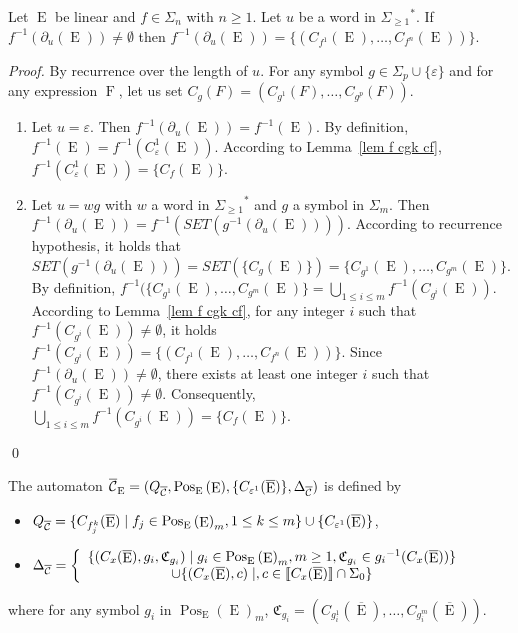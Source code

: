 \documentclass{llncs}
\def\Po#1#2{\Pos_{#1}{(#2)}}
\DeclareMathOperator{\E}{E}
\DeclareMathOperator{\f}{F}
\DeclareMathOperator{\Pos}{Pos}
\def\b#1{\overline{#1}}
\begin{document}
\begin{proposition}\label{prop f deriv u cf}
Let $\E$ be linear and $f\in \Sigma_n$ with $n\geq 1$. Let $u$ be a word in ${\Sigma_{\geq 1}}^*$. If $f^{-1}(\partial_u(\E))\neq \emptyset$ then  $f^{-1}(\partial_u(\E))=\{(C_{f^1}(\E),\ldots,C_{f^n}(\E))\}$.
\end{proposition}
\begin{proof}
 By recurrence over the length of $u$.  For any symbol $g\in\Sigma_p\cup\{\varepsilon\}$ and for any expression $\f$, let us set $C_g(F)=(C_{g^1}(F),\dots,C_{g^p}(F))$.
 \begin{enumerate}
   \item Let $u=\varepsilon$. Then $f^{-1}(\partial_u(\E))=f^{-1}(\E)$. By definition, $f^{-1}(\E)=f^{-1}(C_\varepsilon^1(\E))$. According to Lemma~\ref{lem f cgk cf}, $f^{-1}(C_\varepsilon^1(\E))=\{C_{f}(\E)\}$.
   \item Let $u=wg$ with $w$ a word in ${\Sigma_{\geq 1}}^*$ and $g$ a symbol in $\Sigma_m$. Then $f^{-1}(\partial_u(\E))=f^{-1}(SET(g^{-1}(\partial_u(\E))))$. According to recurrence hypothesis, it holds that $SET(g^{-1}(\partial_u(\E)))=SET(\{C_{g}(\E)\})=\{C_{g^1}(\E),\ldots,C_{g^m}(\E)\}$. By definition, $f^{-1}(\{C_{g^1}(\E),\ldots,C_{g^m}(\E)\}=\bigcup_{1\leq i\leq m} f^{-1}(C_{g^i}(\E))$. According to Lem\-ma~\ref{lem f cgk cf}, for any integer $i$ such that $f^{-1}(C_{g^i}(\E))\neq\emptyset$, it holds  $f^{-1}(C_{g^i}(\E))=\{(C_{f^1}(\E),\ldots,C_{f^n}(\E))\}$. Since $f^{-1}(\partial_u(\E))\neq \emptyset$, there exists at least one integer $i$ such that $f^{-1}(C_{g^i}(\E))\neq\emptyset$. Consequently, $\bigcup_{1\leq i\leq m} f^{-1}(C_{g^i}(\E))=\{C_{f}(\E)\}$.
 \end{enumerate}
 \qed
\end{proof}

\begin{definition}\label{def aut c cont lin}
The automaton ${\cal \b C_{\E}}=(Q_{\b{\cal C}},\Po{\E}{\E},\{C_{{\varepsilon}^1}(\b\E)\},\Delta_{\b{\cal C}})$ is defined by  
 \begin{itemize}
 \item $Q_{\b{\cal C}}=\{C_{f^k_j}(\b\E)\mid f_j\in \Po{\E}{\E}_m,1\leq k\leq m\}\cup\{C_{{\varepsilon}^1}(\b\E)\}$,
\item $\Delta_{\b{\cal C}}=
  \left\{\begin{array}{c}
      \{(C_{x}(\b\E),g_i,\mathfrak{C}_{g_i})\mid  g_i\in\Po{\E}{\E}_m,m\geq 1, \mathfrak{C}_{g_i}\in {g_i}^{-1}(C_{x}(\b\E))\}\\
      \cup\{(C_{x}(\b\E),c)\mid, c\in\llbracket C_{x}(\b\E)\rrbracket\cap\Sigma_0\}\\
    \end{array}
  \right.$
\end{itemize}
where for any symbol $g_i$ in $\Po{\E}{\E}_m$, $\mathfrak{C}_{g_i}=(C_{g^1_i}(\b\E),\dots,C_{g^m_i}(\b\E))$.
\end{definition}
\end{document}

